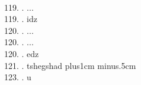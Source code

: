 \begin{tabbing}
\filler\tibsp{}\tenrm\ \tibetan
\egroup  \\
119. .  \> ...	\> \bgroup\tibetan \def\u#1{\vtop{\baselineskip0pt\hbox{#1}\hbox{\tibsp\char123}}}\parindent=0pt \newbox\fillerbox\setbox\fillerbox\hbox{\vrule height0.4cm depth0.4cm width0pt}\def\filler{\copy\fillerbox}\tibsp{}\tibetan{}%
\filler\tibsp{}\tenrm\ \tibetan
\egroup  \\
119. .  \> idz	\> \bgroup\tibetan \def\u#1{\vtop{\baselineskip0pt\hbox{#1}\hbox{\tibsp\char123}}}\parindent=0pt \newbox\fillerbox\setbox\fillerbox\hbox{\vrule height0.4cm depth0.4cm width0pt}\def\filler{\copy\fillerbox}\tibsp{}\tibetan{}%
\filler\tibsp{}\tenrm\ \tibetan
\egroup  \\
120. .  \> ...	\> \bgroup\tibetan \def\u#1{\vtop{\baselineskip0pt\hbox{#1}\hbox{\tibsp\char123}}}\parindent=0pt \newbox\fillerbox\setbox\fillerbox\hbox{\vrule height0.4cm depth0.4cm width0pt}\def\filler{\copy\fillerbox}\tibsp{}\tibetan{}%
\filler\tibsp{}\tenrm\ \tibetan
\egroup  \\
120. .  \> ...	\> \bgroup\tibetan \def\u#1{\vtop{\baselineskip0pt\hbox{#1}\hbox{\tibsp\char123}}}\parindent=0pt \newbox\fillerbox\setbox\fillerbox\hbox{\vrule height0.4cm depth0.4cm width0pt}\def\filler{\copy\fillerbox}\tibsp{}\tibetan{}%
\filler\tibsp{}\tenrm\ \tibetan
\egroup  \\
120. .  \> edz	\> \bgroup\tibetan \def\u#1{\vtop{\baselineskip0pt\hbox{#1}\hbox{\tibsp\char123}}}\parindent=0pt \newbox\fillerbox\setbox\fillerbox\hbox{\vrule height0.4cm depth0.4cm width0pt}\def\filler{\copy\fillerbox}\tibsp{}\tibetan{}%
\filler\tibsp{}\tenrm\ \tibetan
\egroup  \\
121. .	\> tshegshad\> \bgroup\tibetan \def\u#1{\vtop{\baselineskip0pt\hbox{#1}\hbox{\tibsp\char123}}}\parindent=0pt \newbox\fillerbox\setbox\fillerbox\hbox{\vrule height0.4cm depth0.4cm width0pt}\def\filler{\copy\fillerbox}\filler\tibsp{}\hskip1cm plus1cm minus.5cm\tibetan
\egroup  \\
123. .	\> u	\> \bgroup\tibetan \def\u#1{\vtop{\baselineskip0pt\hbox{#1}\hbox{\tibsp\char123}}}\parindent=0pt \newbox\fillerbox\setbox\fillerbox\hbox{\vrule height0.4cm depth0.4cm width0pt}\def\filler{\copy\fillerbox}\u{\char29}\filler\tibsp{}\tenrm\ \tibetan
\egroup  \\

\end{tabbing}
